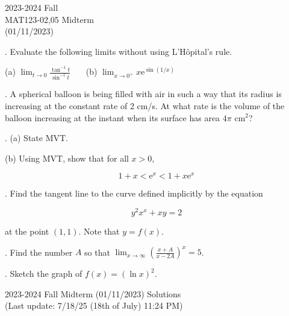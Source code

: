 \documentclass{article}
\begin{document}
\pagestyle{empty}
\large

\begin{center}
2023-2024 Fall \\MAT123-02,05 Midterm\\(01/11/2023)
\end{center}

. Evaluate the following limits without using L'Hôpital's rule.

\hfill

(a) $\displaystyle \lim_{t\to 0} \frac{\tan^{-1} t}{\sin^{-1} t}$ \ \ \ (b) $\displaystyle \lim_{x\to 0^+} x\mathrm{e}^{\displaystyle \sin(1/x)}$

\hfill

. A spherical balloon is being filled with air in such a way that its radius is increasing at the constant rate of 2 cm/s. At what rate is the volume of the balloon increasing at the instant when its surface has area $4\pi$ cm$^2$?

\hfill

. (a) State MVT.

\hfill

\noindent (b) Using MVT, show that for all $x>0$,

\begin{equation*}
1+x < \mathrm{e}^x < 1+x\mathrm{e}^x
\end{equation*}

\hfill

. Find the tangent line to the curve defined implicitly by the equation

\begin{equation*}
y^2x^x + xy = 2
\end{equation*}

\noindent at the point $(1,1)$. Note that $y=f(x)$.

\hfill

. Find the number $A$ so that $\displaystyle \lim_{x \to \infty} \left(\frac{x+A}{x-2A}\right)^{x}= 5$.

\hfill

. Sketch the graph of $\displaystyle f(x) = (\ln x)^2$.

\newpage

\begin{center}
2023-2024 Fall Midterm (01/11/2023) Solutions\\
(Last update: 7/18/25 (18th of July) 11:24 PM)
\end{center}
\end{document}
